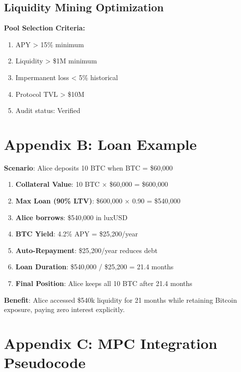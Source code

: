 \documentclass[11pt,a4paper]{article}
\begin{document}
\subsection{Liquidity Mining Optimization}

\textbf{Pool Selection Criteria:}
\begin{enumerate}
\item APY > 15\% minimum
\item Liquidity > \$1M minimum
\item Impermanent loss < 5\% historical
\item Protocol TVL > \$10M
\item Audit status: Verified
\end{enumerate}

\section{Appendix B: Loan Example}

\textbf{Scenario}: Alice deposits 10 BTC when BTC = \$60,000

\begin{enumerate}
\item \textbf{Collateral Value}: 10 BTC × \$60,000 = \$600,000
\item \textbf{Max Loan (90\% LTV)}: \$600,000 × 0.90 = \$540,000
\item \textbf{Alice borrows}: \$540,000 in luxUSD
\item \textbf{BTC Yield}: 4.2\% APY = \$25,200/year
\item \textbf{Auto-Repayment}: \$25,200/year reduces debt
\item \textbf{Loan Duration}: \$540,000 / \$25,200 = 21.4 months
\item \textbf{Final Position}: Alice keeps all 10 BTC after 21.4 months
\end{enumerate}

\textbf{Benefit}: Alice accessed \$540k liquidity for 21 months while retaining Bitcoin exposure, paying zero interest explicitly.

\section{Appendix C: MPC Integration Pseudocode}
\end{document}
